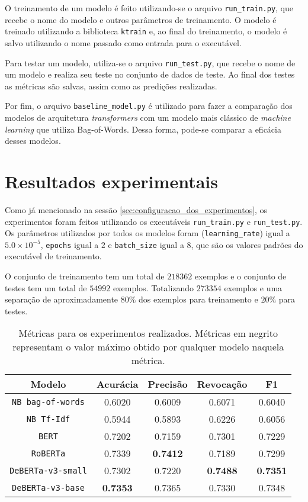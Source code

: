 O treinamento de um modelo é feito utilizando-se o arquivo
\texttt{run\_train.py}, que recebe o nome do modelo e outros parâmetros de
treinamento. O modelo é treinado utilizando a biblioteca \texttt{ktrain} e, ao
final do treinamento, o modelo é salvo utilizando o nome passado como entrada
para o executável.

Para testar um modelo, utiliza-se o arquivo \texttt{run\_test.py}, que recebe o
nome de um modelo e realiza seu teste no conjunto de dados de teste. Ao final
dos testes as métricas são salvas, assim como as predições realizadas.

Por fim, o arquivo \texttt{baseline\_model.py} é utilizado para fazer a
comparação dos modelos de arquitetura \textit{transformers} com um modelo mais
clássico de \textit{machine learning} que utiliza Bag-of-Words. Dessa forma,
pode-se comparar a eficácia desses modelos.

\section{Resultados experimentais}%
\label{sec:resultados_experimentais}

Como já mencionado na sessão \ref{sec:configuracao_dos_experimentos}, os
experimentos foram feitos utilizando os executáveis \texttt{run\_train.py} e
\texttt{run\_test.py}. Os parâmetros utilizados por todos os modelos foram
(\texttt{learning\_rate}) igual a $5.0\times 10^{-5}$, \texttt{epochs} igual a
$2$ e \texttt{batch\_size} igual a $8$, que são os valores padrões do executável
de treinamento.

O conjunto de treinamento tem um total de $218362$ exemplos e o conjunto de
testes tem um total de $54992$ exemplos. Totalizando $273354$ exemplos e uma
separação de aproximadamente $80\%$ dos exemplos para treinamento e $20\%$ para
testes.

\begin{table}[h]
\centering
\caption{Métricas para os experimentos realizados. Métricas em negrito
   representam o valor máximo obtido por qualquer modelo naquela métrica.}
\label{tab:experiments}
\begin{tabular}{c | c c c c}
   \textbf{Modelo} & \textbf{Acurácia} & \textbf{Precisão} & \textbf{Revocação}
                  & \textbf{F1} \\ \hline \hline
   \texttt{NB bag-of-words} & 0.6020 & 0.6009 & 0.6071 & 0.6040 \\
   \texttt{NB Tf-Idf} & 0.5944 & 0.5893 & 0.6226 & 0.6056 \\ \hline
   \texttt{BERT} & 0.7202 & 0.7159 & 0.7301 & 0.7229 \\
   \texttt{RoBERTa} & 0.7339 & \textbf{0.7412} & 0.7189 & 0.7299 \\
   \texttt{DeBERTa-v3-small} & 0.7302 & 0.7220 & \textbf{0.7488} & \textbf{0.7351} \\
   \texttt{DeBERTa-v3-base} & \textbf{0.7353} & 0.7365 & 0.7330 & 0.7348 \\ \hline
\end{tabular}
\end{table}

